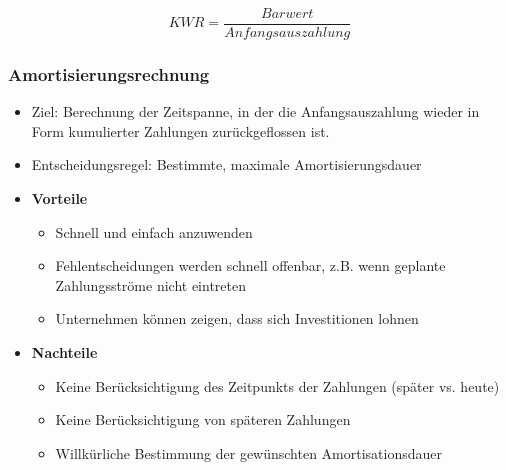 \[KWR = \frac{Barwert}{Anfangsauszahlung}\]

\subsubsection{Amortisierungsrechnung}
\begin{itemize}
	\item Ziel: Berechnung der Zeitspanne, in der die Anfangsauszahlung wieder in Form kumulierter Zahlungen zurückgeflossen ist.
	\item Entscheidungsregel: Bestimmte, maximale Amortisierungsdauer
	\item \textbf{Vorteile}
	\begin{itemize}
		\item Schnell und einfach anzuwenden
		\item Fehlentscheidungen werden schnell offenbar, z.B. wenn geplante Zahlungsströme nicht eintreten
		\item Unternehmen können zeigen, dass sich Investitionen lohnen
	\end{itemize}
	\item \textbf{Nachteile}
	\begin{itemize}
		\item Keine Berücksichtigung des Zeitpunkts der Zahlungen (später vs. heute)
		\item Keine Berücksichtigung von späteren Zahlungen
		\item Willkürliche Bestimmung der gewünschten Amortisationsdauer
	\end{itemize}
\end{itemize}

